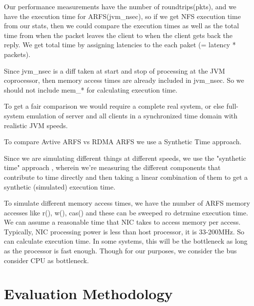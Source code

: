 \documentclass[10pt]{article}
\begin{document}
Our performance measurements have the number of roundtrips(pkts), and we have
the execution time for ARFS(jvm_nsec), so if we get NFS execution time from
our stats, then we could compare the execution times as well as the total time
from when the packet leaves the client to when the client gets back the reply.
We get total time by assigning latencies to the each paket (= latency * packets).

Since jvm_nsec is a diff taken at start and stop of processing at the JVM coprocessor,
then memory access times are already included in jvm_nsec. So we should not include mem_* for
calculating execution time.

To get a fair comparison we would require a complete real system, or else full-system emulation of
server and all clients in a synchronized time domain with realistic JVM speeds.

To compare Avtive ARFS vs RDMA ARFS we use a Synthetic Time approach.

Since we are simulating different things at different speeds, we use the "synthetic time"
approach , wherein we're measuring the different components that contribute to time directly
and then taking a linear combination of them to get a synthetic (simulated) execution time.

To simulate different memory access times, we have the number of ARFS memory accesses like
r(), w(), cas() and these can be sweeped ro detrmine execution time. We can assume a reasonable
time that NIC takes to access memory per access. Typically, NIC processing power is less than host
processor, it is 33-200MHz. So can calculate execution time. In some systems, this will be the
bottleneck as long as the processor is fast enough. Though for our purposes, we consider the bus
consider CPU as bottleneck. 

\section{Evaluation Methodology}
\end{document}
